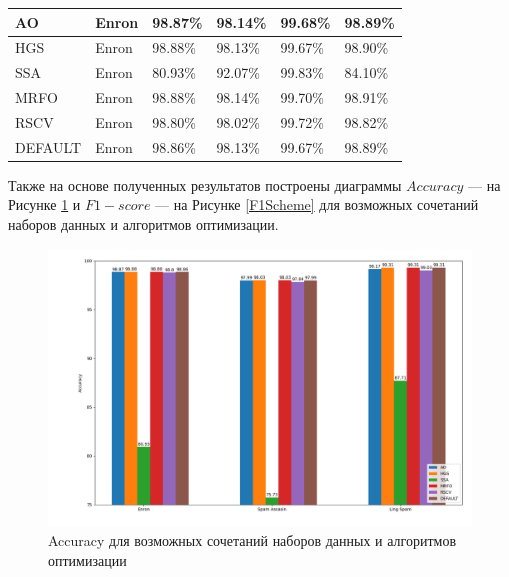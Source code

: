 \begin{table}[!ht]
\begin{tabular}{|p{}|p{}|p{}|p{}|p{}|p{}|}
        AO & Enron & 98.87\% & 98.14\% & 99.68\% & 98.89\% \\ \hline
        HGS & Enron & 98.88\% & 98.13\% & 99.67\% & 98.90\% \\ \hline
        SSA & Enron & 80.93\% & 92.07\% & 99.83\% & 84.10\% \\ \hline
        MRFO & Enron & 98.88\% & 98.14\% & 99.70\% & 98.91\% \\ \hline
        RSCV & Enron & 98.80\% & 98.02\% & 99.72\% & 98.82\% \\ \hline
        DEFAULT & Enron & 98.86\% & 98.13\% & 99.67\% & 98.89\% \\ \hline
    \end{tabular}
    \label{table2}
\end{table}

Также на основе полученных результатов построены диаграммы $Accuracy$ — на Рисунке 
\ref{AccuracyScheme} и $F1-score$ — на Рисунке \ref{F1Scheme} для возможных сочетаний 
наборов данных и алгоритмов оптимизации.

\begin{figure}[H]
    \centering
    \includegraphics[width=165mm]{static/Accuracy.png}
    \caption{Accuracy для возможных сочетаний наборов данных и алгоритмов оптимизации}
    \label{AccuracyScheme}
\end{figure}


